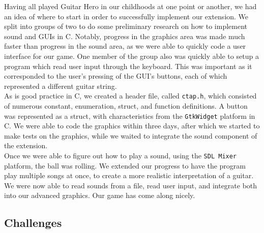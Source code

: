 \documentclass[11pt]{article}
\begin{document}
Having all played Guitar Hero in our childhoods at one point or another, we had an idea of where to start in order to successfully implement our extension. We split into groups of two to do some preliminary research on how to implement sound and GUIs in C. Notably, progress in the graphics area was made much faster than progress in the sound area, as we were able to quickly code a user interface for our game. One member of the group also was quickly able to setup a program which read user input through the keyboard. This was important as it corresponded to the user's pressing of the GUI's buttons, each of which represented a different guitar string.
\\ \hspace{10mm} As is good practice in C, we created a header file, called \texttt{ctap.h}, which consisted of numerous constant, enumeration, struct, and function definitions. A button was represented as a struct, with characteristics from the \texttt{GtkWidget} platform in C. We were able to code the graphics within three days, after which we started to make tests on the graphics, while we waited to integrate the sound component of the extension.
\\ \hspace{10mm} Once we were able to figure out how to play a sound, using the \texttt{SDL Mixer} platform, the ball was rolling. We extended our progress to have the program play multiple songs at once, to create a more realistic interpretation of a guitar. We were now able to read sounds from a file, read user input, and integrate both into our advanced graphics. Our game has come along nicely.

\subsection{Challenges}
\end{document}
